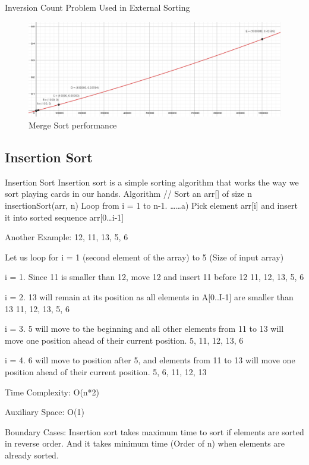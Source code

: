 \documentclass{article}
\begin{document}
Inversion Count Problem
Used in External Sorting

\begin{figure}[h]
	\centering
	\includegraphics[width=0.7\linewidth]{images/mergeSort}
	\caption{Merge Sort performance}
	\label{fig:mergesort}
\end{figure}












\subsection{Insertion Sort}

Insertion Sort
Insertion sort is a simple sorting algorithm that works the way we sort playing cards in our hands.
Algorithm
// Sort an arr[] of size n
insertionSort(arr, n)
Loop from i = 1 to n-1.
……a) Pick element arr[i] and insert it into sorted sequence arr[0…i-1]


Another Example: 
12, 11, 13, 5, 6

Let us loop for i = 1 (second element of the array) to 5 (Size of input array)

i = 1. Since 11 is smaller than 12, move 12 and insert 11 before 12
11, 12, 13, 5, 6

i = 2. 13 will remain at its position as all elements in A[0..I-1] are smaller than 13
11, 12, 13, 5, 6

i = 3. 5 will move to the beginning and all other elements from 11 to 13 will move one position ahead of their current position.
5, 11, 12, 13, 6

i = 4. 6 will move to position after 5, and elements from 11 to 13 will move one position ahead of their current position.
5, 6, 11, 12, 13


Time Complexity: O(n*2)

Auxiliary Space: O(1)

Boundary Cases: Insertion sort takes maximum time to sort if elements are sorted in reverse order. And it takes minimum time (Order of n) when elements are already sorted.
\end{document}

